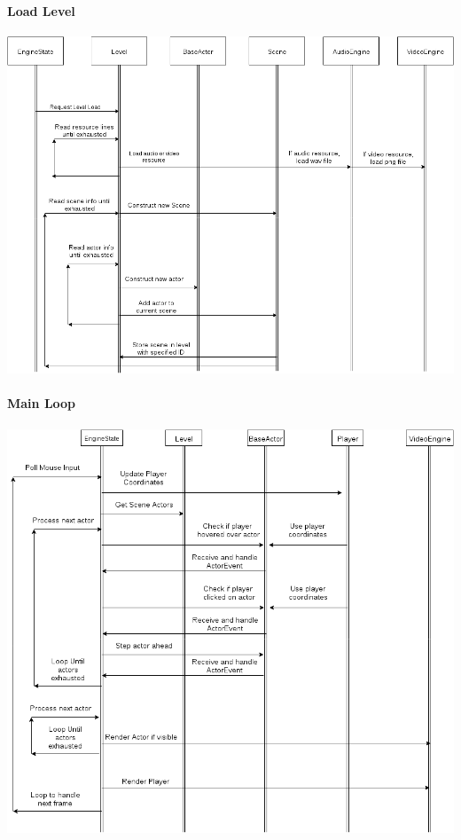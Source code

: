 \documentclass{article}
\begin{document}
			\paragraph{Load Level}
				\begin{center}
					\includegraphics[scale=0.58,angle=90]{load-level.png}
				\end{center}
			\paragraph{Main Loop}
				\begin{center}
					\includegraphics[scale=0.54,angle=90]{main-loop.png}
				\end{center}
%
%
\newpage
\end{document}
